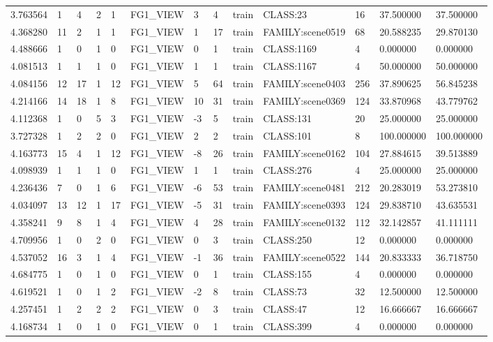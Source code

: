 \begin{tabular}{lllllllllllll}
3.763564 & 1 & 4 & 2 & 1 & FG1\_VIEW & 3 & 4 & train & CLASS:23 & 16 & 37.500000 & 37.500000 \\
4.368280 & 11 & 2 & 1 & 1 & FG1\_VIEW & 1 & 17 & train & FAMILY:scene0519 & 68 & 20.588235 & 29.870130 \\
4.488666 & 1 & 0 & 1 & 0 & FG1\_VIEW & 0 & 1 & train & CLASS:1169 & 4 & 0.000000 & 0.000000 \\
4.081513 & 1 & 1 & 1 & 0 & FG1\_VIEW & 1 & 1 & train & CLASS:1167 & 4 & 50.000000 & 50.000000 \\
4.084156 & 12 & 17 & 1 & 12 & FG1\_VIEW & 5 & 64 & train & FAMILY:scene0403 & 256 & 37.890625 & 56.845238 \\
4.214166 & 14 & 18 & 1 & 8 & FG1\_VIEW & 10 & 31 & train & FAMILY:scene0369 & 124 & 33.870968 & 43.779762 \\
4.112368 & 1 & 0 & 5 & 3 & FG1\_VIEW & -3 & 5 & train & CLASS:131 & 20 & 25.000000 & 25.000000 \\
3.727328 & 1 & 2 & 2 & 0 & FG1\_VIEW & 2 & 2 & train & CLASS:101 & 8 & 100.000000 & 100.000000 \\
4.163773 & 15 & 4 & 1 & 12 & FG1\_VIEW & -8 & 26 & train & FAMILY:scene0162 & 104 & 27.884615 & 39.513889 \\
4.098939 & 1 & 1 & 1 & 0 & FG1\_VIEW & 1 & 1 & train & CLASS:276 & 4 & 25.000000 & 25.000000 \\
4.236436 & 7 & 0 & 1 & 6 & FG1\_VIEW & -6 & 53 & train & FAMILY:scene0481 & 212 & 20.283019 & 53.273810 \\
4.034097 & 13 & 12 & 1 & 17 & FG1\_VIEW & -5 & 31 & train & FAMILY:scene0393 & 124 & 29.838710 & 43.635531 \\
4.358241 & 9 & 8 & 1 & 4 & FG1\_VIEW & 4 & 28 & train & FAMILY:scene0132 & 112 & 32.142857 & 41.111111 \\
4.709956 & 1 & 0 & 2 & 0 & FG1\_VIEW & 0 & 3 & train & CLASS:250 & 12 & 0.000000 & 0.000000 \\
4.537052 & 16 & 3 & 1 & 4 & FG1\_VIEW & -1 & 36 & train & FAMILY:scene0522 & 144 & 20.833333 & 36.718750 \\
4.684775 & 1 & 0 & 1 & 0 & FG1\_VIEW & 0 & 1 & train & CLASS:155 & 4 & 0.000000 & 0.000000 \\
4.619521 & 1 & 0 & 1 & 2 & FG1\_VIEW & -2 & 8 & train & CLASS:73 & 32 & 12.500000 & 12.500000 \\
4.257451 & 1 & 2 & 2 & 2 & FG1\_VIEW & 0 & 3 & train & CLASS:47 & 12 & 16.666667 & 16.666667 \\
4.168734 & 1 & 0 & 1 & 0 & FG1\_VIEW & 0 & 1 & train & CLASS:399 & 4 & 0.000000 & 0.000000 \\

\end{tabular}

